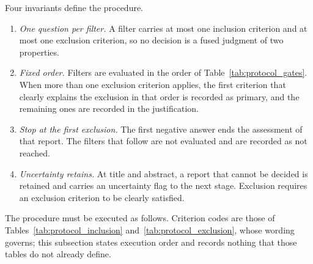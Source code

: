 Four invariants define the procedure.

\begin{enumerate}[label=(\roman*),leftmargin=*]
    \item \textit{One question per filter.} A filter carries at most one inclusion criterion and at most one exclusion criterion, so no decision is a fused judgment of two properties.
    \item \textit{Fixed order.} Filters are evaluated in the order of Table~\ref{tab:protocol_gates}. When more than one exclusion criterion applies, the first criterion that clearly explains the exclusion in that order is recorded as primary, and the remaining ones are recorded in the justification.
    \item \textit{Stop at the first exclusion.} The first negative answer ends the assessment of that report. The filters that follow are not evaluated and are recorded as not reached.
    \item \textit{Uncertainty retains.} At title and abstract, a report that cannot be decided is retained and carries an uncertainty flag to the next stage. Exclusion requires an exclusion criterion to be clearly satisfied.
\end{enumerate}

The procedure must be executed as follows. Criterion codes are those of Tables~\ref{tab:protocol_inclusion} and~\ref{tab:protocol_exclusion}, whose wording governs; this subsection states execution order and records nothing that those tables do not already define.

